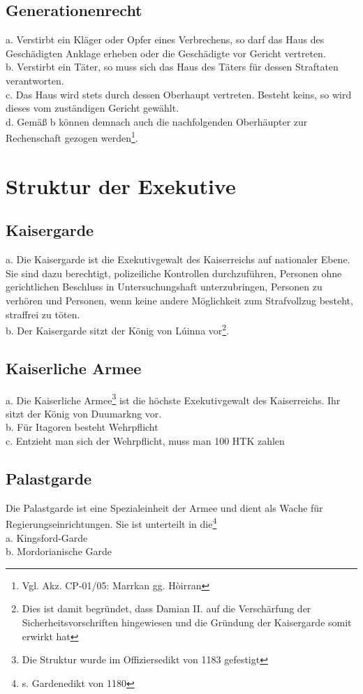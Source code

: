\documentclass{article}
\begin{document}
\subsection{Generationenrecht}
a. Verstirbt ein Kläger oder Opfer eines Verbrechens, so darf das Haus des Geschädigten Anklage erheben oder die Geschädigte vor Gericht vertreten.\\
b. Verstirbt ein Täter, so muss sich das Haus des Täters für dessen Straftaten verantworten.\\
c. Das Haus wird stets durch dessen Oberhaupt vertreten. Besteht keins, so wird dieses vom zuständigen Gericht gewählt.\\
d. Gemäß b können demnach auch die nachfolgenden Oberhäupter zur Rechenschaft gezogen werden\footnote{Vgl. Akz. CP-01/05: Marrkan gg. Hòirran}.

\section{Struktur der Exekutive}
\subsection{Kaisergarde}
a.	Die Kaisergarde ist die Exekutivgewalt des Kaiserreichs auf nationaler Ebene. Sie sind dazu berechtigt, polizeiliche Kontrollen durchzuführen, Personen ohne gerichtlichen Beschluss in Untersuchungshaft unterzubringen, Personen zu verhören und Personen, wenn keine andere Möglichkeit zum Strafvollzug besteht, straffrei zu töten.\\
b.	Der Kaisergarde sitzt der König von Lúinna vor\footnote{Dies ist damit begründet, dass Damian II. auf die Verschärfung der Sicherheitsvorschriften hingewiesen und die Gründung der Kaisergarde somit erwirkt hat}.

\subsection{Kaiserliche Armee}
a. Die Kaiserliche Armee\footnote{Die Struktur wurde im Offiziersedikt von 1183 gefestigt} ist die höchste Exekutivgewalt des Kaiserreichs. Ihr sitzt der König von Duumarkng vor.\\
b. Für Itagoren besteht Wehrpflicht\\
c. Entzieht man sich der Wehrpflicht, muss man 100 HTK zahlen

\subsection{Palastgarde}
Die Palastgarde ist eine Spezialeinheit der Armee und dient als Wache für Regierungseinrichtungen. Sie ist unterteilt in die\footnote{s. Gardenedikt von 1180}\\
a. Kingsford-Garde\\
b. Mordorianische Garde
\end{document}
